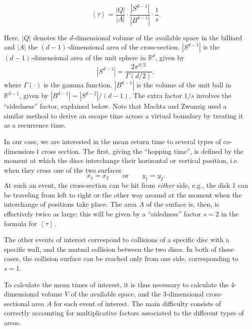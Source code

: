 \documentclass[superscriptaddress,pre,reprint,showpacs,twocolumn]{revtex4-1}
\newcommand{\mean}[1]{\left \langle #1 \right \rangle}
\newcommand{\RR}{\mathbb{R}}
\begin{document}
\begin{equation}\label{meanfreetime}
 \mean{\tau} = \frac{|Q|}{|A|} \cdot \frac{|S^{d-1}|} {|B^{d-1}|} \cdot \frac{1}{s}.
\end{equation}


Here, $|Q|$ denotes the $d$-dimensional volume of the available 
space in the billiard and 
$|A|$ the $(d-1)$-dimensional area of the cross-section.
 $|S^{d-1}|$ is the $(d-1)$-dimensional area of the unit sphere in $\RR^d$, given by
\begin{equation}
  |S^{d-1}| = \frac{2 \pi^{d/2}}{\Gamma(d/2)},
\end{equation}
where $\Gamma(\cdot)$ is the gamma function. 
$|B^{d-1}|$ is the volume of the unit ball 
in $\RR^{d-1}$, given by $|B^{d-1}| = |S^{d-2}| / (d-1)$.
The extra factor $1/s$ involves the ``sidedness'' factor, explained below.
Note that Machta and Zwanzig \cite{MachtaZwan} used a similar method to derive an escape 
time across a virtual boundary by treating it as a recurrence time.

In our case, we are interested in the mean return time to 
several types of co-dimension-$1$ cross section.
The first, giving the ``hopping time'', 
is defined by the moment
at which the discs interchange their horizontal or vertical position, i.e.
when they cross one of the two surfaces
\begin{equation} \label{condchoque}
x_1 = x_2  \qquad \text{or} \qquad y_1 = y_2.
\end{equation}
At such an event, the cross-section can be hit from \emph{either} side,
e.g., the disk 1 can be traveling from left to right or the other way around
at the moment when the interchange of positions take place. 
The area $A$ of the surface is, then, 
 is effectively twice as large; this will be given by a ``sidedness'' factor $s=2$ in the formula
for $\mean{\tau}$.

The other events of interest correspond to collisions of a specific
disc with a specific wall, and the mutual collision between the two discs.
In both of these cases, the collision surface can be reached only from one side, corresponding to $s = 1$.

To calculate the mean times of interest, it is thus necessary to calculate
the 4-dimensional volume $V$ of the available space, and the 3-dimensional cross-sectional area $A$ 
for each event of interest. The main difficulty consists of correctly accounting for multiplicative factors associated to the different 
types of areas.
\end{document}
